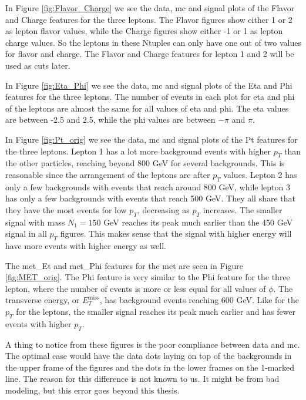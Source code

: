 \documentclass[a4paper, american, 12pt]{report}
\begin{document}
	In Figure \ref{fig:Flavor_Charge} we see the data, \acrshort{mc} and signal plots of the Flavor and Charge features for the three leptons. The Flavor figures show either 1 or 2 as lepton flavor values, while the Charge figures show either -1 or 1 as lepton charge values. So the leptons in these Ntuples can only have one out of two values for flavor and charge. The Flavor and Charge features for lepton 1 and 2 will be used as cuts later.
	
	In Figure \ref{fig:Eta_Phi} we see the data, \acrshort{mc} and signal plots of the Eta and Phi features for the three leptons. The number of events in each plot for eta and phi of the leptons are almost the same for all values of eta and phi. The eta values are between -2.5 and 2.5, while the phi values are between $-\pi$ and $\pi$.
	
	In Figure \ref{fig:Pt_orig} we see the data, \acrshort{mc} and signal plots of the Pt features for the three leptons. Lepton 1 has a lot more background events with higher $p_T$ than the other particles, reaching beyond 800 GeV for several backgrounds. This is reasonable since the arrangement of the leptons are after $p_T$ values. Lepton 2 has only a few backgrounds with events that reach around 800 GeV, while lepton 3 has only a few backgrounds with events that reach 500 GeV. They all share that they have the most events for low $p_T$, decreasing as $p_T$ increases. The smaller signal with mass $N_1=150$ GeV reaches its peak much earlier than the 450 GeV signal in all $p_T$ figures. This makes sense that the signal with higher energy will have more events with higher energy as well.
	
	The met\_Et and met\_Phi features for the \acrshort{met} are seen in Figure \ref{fig:MET_orig}. The Phi feature is very similar to the Phi feature for the three lepton, where the number of events is more or less equal for all values of $\phi$. The transverse energy, or $E_T^{\text{miss}}$, has background events reaching 600 GeV. Like for the $p_T$ for the leptons, the smaller signal reaches its peak much earlier and has fewer events with higher $p_T$.
	
	A thing to notice from these figures is the poor compliance between data and \acrshort{mc}. The optimal case would have the data dots laying on top of the backgrounds in the upper frame of the figures and the dots in the lower frames on the 1-marked line. The reason for this difference is not known to us. It might be from bad modeling, but this error goes beyond this thesis.
	
\end{document}
